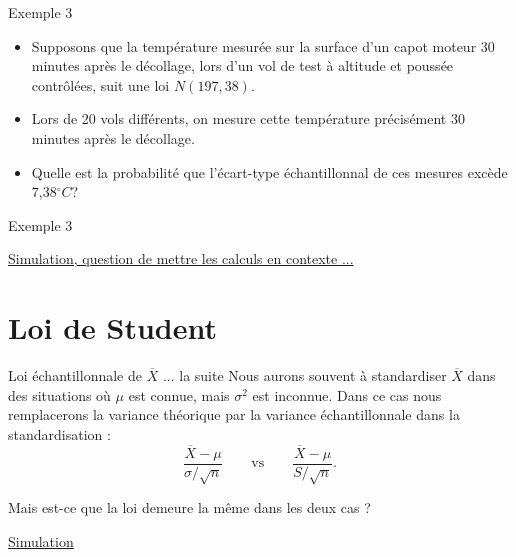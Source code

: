\documentclass{BeamerTemplate}
\begin{document}
\begin{frame}[t]{Exemple 3}

{\small
\begin{itemize}
\item Supposons que la température mesurée sur la surface d’un capot moteur 30 minutes après le décollage, lors d’un vol de test à altitude et poussée contrôlées, suit une loi $N(197, 38)$.
\item Lors de 20 vols différents, on mesure cette température précisément 30 minutes après le décollage.
\item Quelle est la probabilité que l’écart-type échantillonnal de ces mesures excède 7,38$^{\circ} C$?
\end{itemize}

}
\end{frame}

\begin{frame}[t]{Exemple 3}


    \href{https://019fb40b-f3bc-c012-ac7e-62e30d450bcc.share.connect.posit.cloud/}{Simulation, question de mettre les calculs en contexte ...}
\end{frame}


\section{Loi de Student}


\begin{frame}[t]{Loi échantillonnale de $\overline{X}$ ... la suite}
   Nous aurons souvent à standardiser $\overline{X}$ dans des situations où $\mu$ est connue, mais
   $\sigma^2$ est inconnue. Dans ce cas nous remplacerons la variance
   théorique par la variance échantillonnale dans la standardisation :
   $$\frac{\overline{X}-\mu}{\sigma/\sqrt{n}}\qquad\text{vs}\qquad\frac{\overline{X}-\mu}{S/\sqrt{n}}.$$

   \medskip Mais est-ce que la loi demeure la même dans les deux cas ?

\href{https://019fb412-8d31-a2a9-4757-8c4f4a21997f.share.connect.posit.cloud/}{Simulation}
        

\end{frame}
\end{document}
